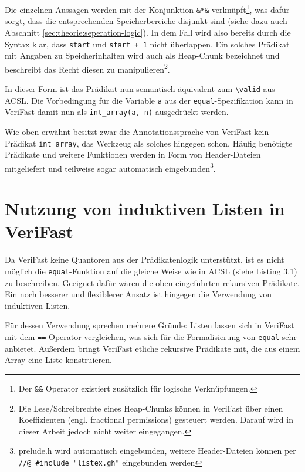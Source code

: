 Die einzelnen Aussagen werden mit der Konjunktion \lstinline{&*&} verknüpft\footnote{Der \lstinline{&&} Operator 
existiert zusätzlich für logische Verknüpfungen.}, was dafür sorgt, dass die entsprechenden
Speicherbereiche disjunkt sind (siehe dazu auch Abschnitt \ref{sec:theorie:seperation-logic}). In dem Fall wird also bereits
durch die Syntax klar, dass \lstinline{start} und \lstinline{start + 1} nicht überlappen. 
Ein solches Prädikat
mit Angaben zu Speicherinhalten wird auch als Heap-Chunk bezeichnet und beschreibt das Recht diesen zu
manipulieren\footnote{Die Lese/Schreibrechte eines Heap-Chunks können in VeriFast über einen Koeffizienten
(engl. fractional permissions) gesteuert werden. Darauf wird in dieser Arbeit jedoch nicht weiter eingegangen.}.

In dieser Form ist das Prädikat nun semantisch äquivalent zum \lstinline{\valid} aus ACSL. Die Vorbedingung für die
Variable \lstinline{a} aus der \texttt{equal}-Spezifikation kann in VeriFast damit nun als \lstinline{int_array(a, n)}
ausgedrückt werden.

Wie oben erwähnt besitzt zwar die Annotationssprache von VeriFast kein Prädikat \lstinline{int_array}, das Werkzeug
als solches hingegen schon. Häufig benötigte Prädikate und weitere Funktionen werden in Form von Header-Dateien
mitgeliefert und teilweise sogar automatisch eingebunden\footnote{prelude.h wird automatisch eingebunden, weitere 
Header-Dateien können per \\ \lstinline{//@ #include "listex.gh"} eingebunden werden}.


\section{Nutzung von induktiven Listen in VeriFast}
\label{sec:induktive-listen}

Da VeriFast keine Quantoren aus der Prädikatenlogik unterstützt, ist es nicht möglich die \texttt{equal}-Funktion
auf die gleiche Weise wie in ACSL (siehe Listing 3.1) zu beschreiben. Geeignet dafür wären die oben eingeführten
rekursiven Prädikate. Ein noch besserer und flexiblerer Ansatz ist hingegen die Verwendung von induktiven Listen.

Für dessen Verwendung sprechen mehrere Gründe: Listen lassen sich in VeriFast mit dem \lstinline{==} Operator vergleichen,
was sich für die Formalisierung von \texttt{equal} sehr anbietet. Außerdem bringt VeriFast etliche rekursive Prädikate
mit, die aus einem Array eine Liste konstruieren.


